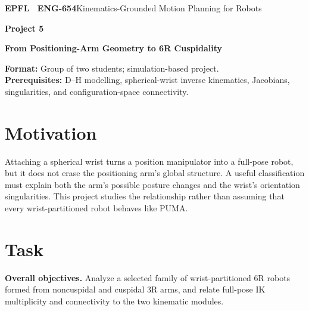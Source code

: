 \documentclass[11pt,a4paper]{article}
\begin{document}
{\small\textbf{EPFL \textbar\ ENG-654}\hfill Kinematics-Grounded Motion Planning for Robots}
\vspace{5mm}

{\color{epflred}\Large\bfseries Project 5}

{\LARGE\bfseries From Positioning-Arm Geometry to 6R Cuspidality\par}

\textbf{Format:} Group of two students; simulation-based project.\\
\textbf{Prerequisites:} D--H modelling, spherical-wrist inverse kinematics,
Jacobians, singularities, and configuration-space connectivity.

\section*{Motivation}
Attaching a spherical wrist turns a position manipulator into a full-pose
robot, but it does not erase the positioning arm's global structure. A useful
classification must explain both the arm's possible posture changes and the
wrist's orientation singularities. This project studies the relationship rather
than assuming that every wrist-partitioned robot behaves like PUMA.

\section*{Task}
\textbf{Overall objectives.} Analyze a selected family of wrist-partitioned 6R robots formed from
noncuspidal and cuspidal 3R arms, and relate full-pose IK multiplicity and
connectivity to the two kinematic modules.
\end{document}
